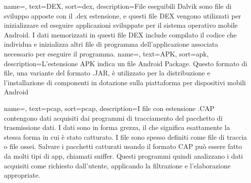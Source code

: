 {
    name=,
    text=DEX,
    sort=dex,
    description={File eseguibili Dalvik sono file di sviluppo apposte con il .dex estensione, e questi file DEX vengono utilizzati per inizializzare ed eseguire applicazioni sviluppate per il sistema operativo mobile Android.
    I dati memorizzati in questi file DEX include compilato il codice che individua e inizializza altri file di programma dell'applicazione associata necessario per eseguire il programma.}
}
{
    name=,
    text=APK,
    sort=apk,
    description={L'estensione APK indica un file Android Package. Questo formato di file, una variante del formato .JAR, è utilizzato per la distribuzione e l'installazione di componenti in dotazione sulla piattaforma per dispositivi mobili Android}
}

{
    name=,
    text=pcap,
    sort=pcap,
    description={I  file con estensione .CAP contengono dati acquisiti dai programmi di tracciamento del pacchetto di trasmissione dati. I dati sono in forma grezza, il che significa esattamente la stessa forma in cui è stato catturato.
    I file sono spesso definiti come file di traccia o file ossei. Salvare i pacchetti catturati usando il formato CAP può essere fatto da molti tipi di app, chiamati sniffer. Questi programmi quindi analizzano i dati acquisiti come richiesto dall'utente, applicando la filtrazione e l'elaborazione appropriate.}
}

